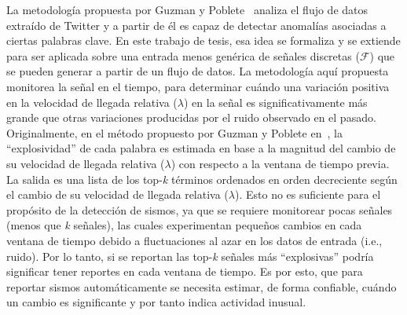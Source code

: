 %
La metodología propuesta por Guzman y Poblete~\cite{guzman2013line} analiza el flujo de datos extraído de Twitter y a partir de él es capaz de detectar anomalías asociadas a ciertas palabras clave. 
%
En este trabajo de tesis, esa idea se formaliza y se extiende para ser aplicada sobre una entrada menos genérica de señales discretas (${\mathcal F}$) que se pueden generar a partir de un flujo de datos. 
%
La metodología aquí propuesta monitorea la señal en el tiempo, para determinar cuándo una variación positiva en la velocidad de llegada relativa ($\lambda$) en la señal es significativamente más grande que otras variaciones producidas por el ruido observado en el pasado.
%
Originalmente, en el método propuesto por Guzman y Poblete en~\cite{guzman2013line}, la ``explosividad'' de cada palabra es estimada en base a la magnitud del cambio de su velocidad de llegada relativa ($\lambda$) con respecto a la ventana de tiempo previa.
%
La salida es una lista de los top-\emph{k} términos ordenados en orden decreciente según el cambio de su velocidad de llegada relativa ($\lambda$).
%
Esto no es suficiente para el propósito de la detección de sismos, ya que se requiere monitorear pocas señales (menos que \emph{k} señales), las cuales experimentan pequeños cambios en cada ventana de tiempo debido a fluctuaciones al azar en los datos de entrada (i.e., ruido).
%
Por lo tanto, si se reportan las top-\emph{k} señales más ``explosivas'' podría significar tener reportes en cada ventana de tiempo.
%
Es por esto, que para reportar sismos automáticamente se necesita estimar, de forma confiable, cuándo un cambio es significante y por tanto indica actividad inusual.

